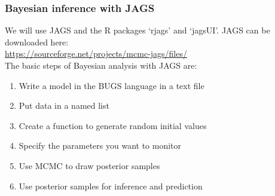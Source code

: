 \documentclass[color=usenames,dvipsnames]{beamer}\usepackage[]{graphicx}\usepackage[]{xcolor}
\begin{document}
\begin{frame}
  \frametitle{Bayesian inference with JAGS}
  We will use JAGS and the R packages `rjags' and `jagsUI'.
  JAGS can be downloaded here:  \\
  \centering
  \vfill
  \href{
    https://sourceforge.net/projects/mcmc-jags/files/}{
    \large
    \color{blue}
    https://sourceforge.net/projects/mcmc-jags/files/
  } \\
  \pause
  \vfill
  \flushleft
  The basic steps of Bayesian analysis with JAGS are:
  \begin{enumerate}%
    \item Write a model in the BUGS language in a text file
    \item Put data in a named list
    \item Create a function to generate random initial values
    \item Specify the parameters you want to monitor
    \item Use MCMC to draw posterior samples
    \item Use posterior samples for inference and prediction
  \end{enumerate}
\end{frame}
\end{document}
